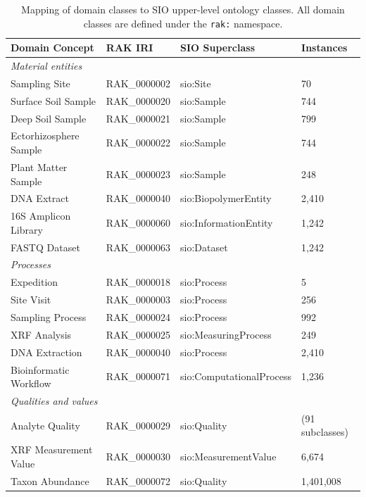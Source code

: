 \begin{table}[h]
	\centering
	\caption{Mapping of domain classes to SIO upper-level ontology classes. All domain classes are defined under the \texttt{rak:} namespace.}
	\label{tab:class_mapping}
	\begin{tabular}{llll}
		\toprule
		Domain Concept        & RAK IRI          & SIO Superclass           & Instances \\
		\midrule
		\multicolumn{4}{l}{\textit{Material entities}} \\
		Sampling Site         & RAK\_0000002     & sio:Site                 & 70        \\
		Surface Soil Sample   & RAK\_0000020     & sio:Sample               & 744       \\
		Deep Soil Sample      & RAK\_0000021     & sio:Sample               & 799       \\
		Ectorhizosphere Sample & RAK\_0000022     & sio:Sample               & 744       \\
		Plant Matter Sample   & RAK\_0000023     & sio:Sample               & 248       \\
		DNA Extract           & RAK\_0000040     & sio:BiopolymerEntity     & 2,410     \\
		16S Amplicon Library  & RAK\_0000060     & sio:InformationEntity    & 1,242     \\
		FASTQ Dataset         & RAK\_0000063     & sio:Dataset              & 1,242     \\
		\midrule
		\multicolumn{4}{l}{\textit{Processes}} \\
		Expedition            & RAK\_0000018     & sio:Process              & 5         \\
		Site Visit            & RAK\_0000003     & sio:Process              & 256       \\
		Sampling Process      & RAK\_0000024     & sio:Process              & 992       \\
		XRF Analysis          & RAK\_0000025     & sio:MeasuringProcess     & 249       \\
		DNA Extraction        & RAK\_0000040     & sio:Process              & 2,410     \\
		Bioinformatic Workflow & RAK\_0000071    & sio:ComputationalProcess & 1,236     \\
		\midrule
		\multicolumn{4}{l}{\textit{Qualities and values}} \\
		Analyte Quality       & RAK\_0000029     & sio:Quality              & (91 subclasses) \\
		XRF Measurement Value & RAK\_0000030     & sio:MeasurementValue     & 6,674     \\
		Taxon Abundance       & RAK\_0000072     & sio:Quality              & 1,401,008 \\
		\bottomrule
	\end{tabular}
\end{table}
